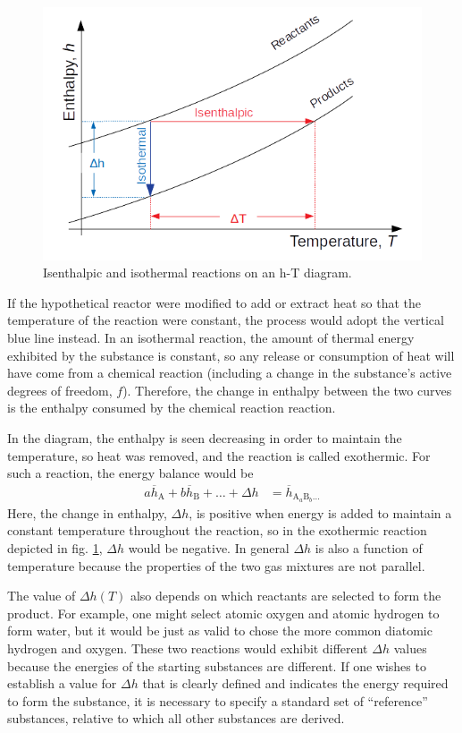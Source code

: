 \begin{figure}
\centering
\includegraphics[width=.97\linewidth]{figures/hf}
\caption{Isenthalpic and isothermal reactions on an h-T diagram.}\label{fig:hf}
\end{figure}

If the hypothetical reactor were modified to add or extract heat so that the temperature of the reaction were constant, the process would adopt the vertical blue line instead.  In an isothermal reaction, the amount of thermal energy exhibited by the substance is constant, so any release or consumption of heat will have come from a chemical reaction (including a change in the substance's active degrees of freedom, $f$).  Therefore, the change in enthalpy between the two curves is the enthalpy consumed by the chemical reaction reaction.  

In the diagram, the enthalpy is seen decreasing in order to maintain the temperature, so heat was removed, and the reaction is called exothermic.  For such a reaction, the energy balance would be
\begin{align}
a \overline{h}_\mathrm{A} + b \overline{h}_\mathrm{B} + \ldots + \Delta h &= \overline{h}_{\mathrm{A}_a \mathrm{B}_b \ldots}
\end{align}
Here, the change in enthalpy, $\Delta h$, is positive when energy is added to maintain a constant temperature throughout the reaction, so in the exothermic reaction depicted in fig. \ref{fig:hf}, $\Delta h$ would be negative.  In general $\Delta h$ is also a function of temperature because the properties of the two gas mixtures are not parallel.

The value of $\Delta h(T)$ also depends on which reactants are selected to form the product.  For example, one might select atomic oxygen and atomic hydrogen to form water, but it would be just as valid to chose the more common diatomic hydrogen and oxygen.  These two reactions would exhibit different $\Delta h$ values because the energies of the starting substances are different.  If one wishes to establish a value for $\Delta h$ that is clearly defined and indicates the energy required to form the substance, it is necessary to specify a standard set of ``reference'' substances, relative to which all other substances are derived.

